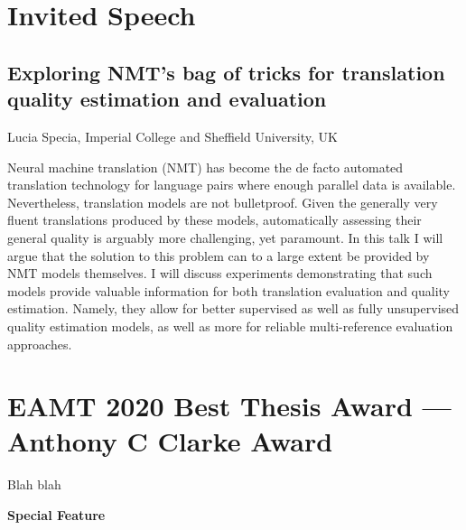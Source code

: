 \documentclass[a4paper,11pt,twoside]{book}
\newcommand{\newoddpage} {\clearpage
  \ifthenelse{\isodd{\value{page}}}{}
  {\thispagestyle{empty}\quad\newpage}}
\newcommand{\addpaper}[5]{%
  \newoddpage
  \phantomsection
  \addcontentsline{toc}{section}{#3. \emph{#4}}  
  \thispagestyle{fancy} %
  
  \lfoot{\tiny {Martins, Moniz, Fumega, Martins, Batista, Coheur, Parra, Trancoso, Turchi, Bisazza, Moorkens, Guerberof, Nurminen, Marg, Forcada (eds.)}\\
    {\em Proceedings of the 22nd Annual Conference of the European Association for Machine Translation}, p. \pageref{beg#2}--\pageref{end#2}\\
      Lisboa, Portugal, November 2020. %
  }
  \cfoot{}
  \label{beg#2}
  
  \pagestyle{fancy} %
  \lfoot{} %
  \cfoot{\thepage} 
  
}
\begin{document}
\newoddpage
\mainmatter

\chapter*{Invited Speech}

\section*{Exploring NMT's bag of tricks for translation quality estimation and evaluation}\label{invited}
Lucia Specia, Imperial College and Sheffield University, UK
\vspace{0.5cm}

Neural machine translation (NMT) has become the de facto automated translation technology for language pairs where enough parallel data is available. Nevertheless, translation models are not bulletproof. Given the generally very fluent translations produced by these models, automatically assessing their general quality is arguably more challenging, yet paramount. In this talk I will argue that the solution to this problem can to a large extent be provided by NMT models themselves. I will discuss experiments demonstrating that such models provide valuable information for both translation evaluation and quality estimation. Namely, they allow for better supervised as well as fully unsupervised quality estimation models, as well as more for reliable multi-reference evaluation approaches.


\chapter*{EAMT 2020 Best Thesis Award --- Anthony C Clarke Award}

Blah blah 


\newpage %
\cfoot{}
\vspace*{\fill}
\begin{center}
\begin{Huge}
\textbf{Special Feature}
\end{Huge}
\end{center}
\vspace*{\fill}
\newpage
\cfoot{\thepage}
\end{document}
